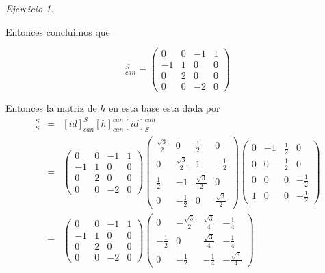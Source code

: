 \documentclass[11pt,a4paper]{article}
\theoremstyle{definition}
\theoremstyle{remark}
\newtheorem{exc}{Ejercicio}
\begin{document}
\begin{exc}
\begin{enumerate}
		Entonces concluimos que
		
		\begin{equation}
		[id]_{can}^S = 
		\begin{pmatrix}
 		0 & 0 & -1 & 1
 		\\ -1 & 1 & 0 & 0
 		\\ 0 & 2 & 0 & 0
 		\\ 0 & 0 & -2 & 0  		
 		\end{pmatrix} \nonumber 
		\end{equation}
		
		Entonces la matriz de $ h $ en esta base esta dada por
		\begin{eqnarray}
		[h]_S^S & = & [id]_{can}^S[h]_{can}^{can}[id]_S^{can}\nonumber
		\\ & = & 
		\begin{pmatrix}
 		0 & 0 & -1 & 1
 		\\ -1 & 1 & 0 & 0
 		\\ 0 & 2 & 0 & 0
 		\\ 0 & 0 & -2 & 0  		
 		\end{pmatrix}
		\begin{pmatrix}
    	\frac{\sqrt{3}}{2} & 0 & \frac{1}{2} & 0
    	\\ 0 & \frac{\sqrt{3}}{2} & 1 & -\frac{1}{2} 
    	\\ \frac{1}{2} & -1 & \frac{\sqrt{3}}{2} & 0
    	\\ 0 & -\frac{1}{2} & 0 & \frac{\sqrt{3}}{2}
    	\end{pmatrix} 
		\begin{pmatrix}
		0 & -1 & \frac{1}{2} & 0
		\\ 0 & 0 & \frac{1}{2} & 0
		\\ 0 & 0 & 0 & -\frac{1}{2}  
		\\ 1 & 0 & 0 & -\frac{1}{2}
		\end{pmatrix} \nonumber
		\\ & = &
		\begin{pmatrix}
 		0 & 0 & -1 & 1
 		\\ -1 & 1 & 0 & 0
 		\\ 0 & 2 & 0 & 0
 		\\ 0 & 0 & -2 & 0  		
 		\end{pmatrix} 
		\begin{pmatrix}
		0 & -\frac{\sqrt{3}}{2} & \frac{\sqrt{3}}{4} & -\frac{1}{4}
		\\ -\frac{1}{2} & 0 & \frac{\sqrt{3}}{4} & -\frac{1}{4}
		\\ 0 & -\frac{1}{2} & -\frac{1}{4} & -\frac{\sqrt{3}}{4}  

\end{pmatrix}
\end{eqnarray}
\end{enumerate}
\end{exc}
\end{document}
